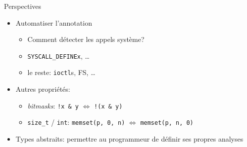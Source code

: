 
\begin{frame}{Perspectives}
    \begin{itemize}
        \item Automatiser l'annotation
            \begin{itemize}
                \item Comment détecter les appels système?
                \item \texttt{SYSCALL\_DEFINEx}, …
                \item le reste: \texttt{ioctl}s, FS, …
            \end{itemize}
        \item Autres propriétés:
            \begin{itemize}
                \item \emph{bitmasks}: \texttt{!x \& y} $⇔$ \texttt{!(x \& y)}
                \item \texttt{size\_t} / \texttt{int}: \texttt{memset(p, 0, n)} $⇔$ \texttt{memset(p, n, 0)}
            \end{itemize}
        \item Types abstraits: permettre au programmeur de définir ses propres
            analyses
        \end{itemize}
\end{frame}
